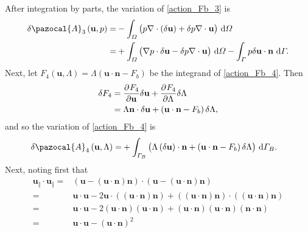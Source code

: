 After integration by parts, the variation of \cref{action_Fb_3} is 
\begin{align}
  \delta \pazocal{A}_3 \left(\mathbf{u}, p \right) = &- \int_{\Omega} \big( p \nabla \cdot \left( \delta \mathbf{u} \right) + \delta p \nabla \cdot \mathbf{u} \big) \d{\Omega} \notag \\
  \label{action_variation_Fb_3}
  = & + \int_{\Omega} \big( \nabla p \cdot \delta \mathbf{u} - \delta p \nabla \cdot \mathbf{u} \big) \d{\Omega} - \int_{\Gamma} p \delta \mathbf{u} \cdot \mathbf{n} \d{\Gamma}.
\end{align}
Next, let $F_4 (\mathbf{u}, \Lambda) = \Lambda \left( \mathbf{u} \cdot \mathbf{n} - F_b \right)$ be the integrand of \cref{action_Fb_4}.
Then
\begin{align*}
  \delta F_4 &= \frac{\partial{^{}} F_4}{\partial \mathbf{u}{^{}} } \delta \mathbf{u} + \frac{\partial{^{}} F_4}{\partial \Lambda{^{}} } \delta \Lambda \\
  &= \Lambda \mathbf{n} \cdot \delta \mathbf{u} + \left( \mathbf{u} \cdot \mathbf{n} - F_b \right) \delta \Lambda,
\end{align*}
and so the variation of \cref{action_Fb_4} is
\begin{align}
  \label{action_variation_Fb_4}
  \delta \pazocal{A}_4 \left(\mathbf{u}, \Lambda \right) = &+ \int_{\Gamma_B} \big( \Lambda \left( \delta \mathbf{u} \right) \cdot \mathbf{n} + \left( \mathbf{u} \cdot \mathbf{n} - F_b \right) \delta \Lambda \big) \d{\Gamma_B}.
\end{align}
Next, noting first that
\begin{align*}
  \mathbf{u}_{\Vert} \cdot \mathbf{u}_{\Vert} = & \left( \mathbf{u} - \left( \mathbf{u} \cdot \mathbf{n} \right) \mathbf{n} \right) \cdot \left( \mathbf{u} - \left( \mathbf{u} \cdot \mathbf{n} \right) \mathbf{n} \right) \\
  = & \mathbf{u} \cdot \mathbf{u} - 2 \mathbf{u} \cdot \left( \left( \mathbf{u} \cdot \mathbf{n} \right) \mathbf{n} \right) + \left( \left( \mathbf{u} \cdot \mathbf{n} \right) \mathbf{n} \right) \cdot \left( \left( \mathbf{u} \cdot \mathbf{n} \right) \mathbf{n} \right) \\
  = & \mathbf{u} \cdot \mathbf{u} - 2 \left( \mathbf{u} \cdot \mathbf{n} \right) \left( \mathbf{u} \cdot \mathbf{n} \right) + \left( \mathbf{u} \cdot \mathbf{n} \right) \left( \mathbf{u} \cdot \mathbf{n} \right) \left( \mathbf{n} \cdot \mathbf{n} \right) \\
  = & \mathbf{u} \cdot \mathbf{u} - \left( \mathbf{u} \cdot \mathbf{n} \right)^2
\end{align*}
